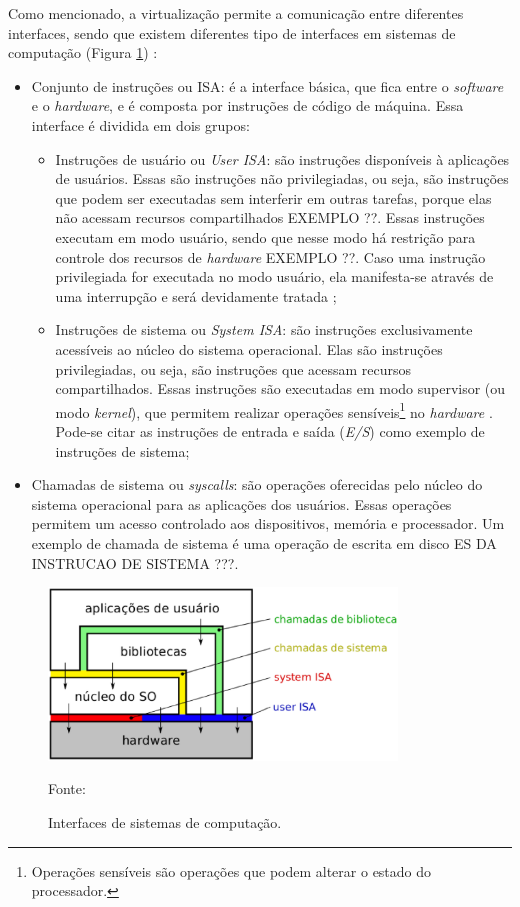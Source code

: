 Como mencionado, a virtualização permite a comunicação entre diferentes interfaces, sendo que existem diferentes tipo de interfaces
em sistemas de computação (Figura \ref{fig:interfaces_isa}) \cite{maziero2013}:
\begin{itemize}
 \item Conjunto de instruções ou \ac{ISA}: é a interface básica, que fica entre o \textit{software} e o \textit{hardware}, e é composta por 
 instruções de código de máquina. Essa interface é dividida em dois grupos:
 \begin{itemize}
  \item Instruções de usuário ou \textit{User \ac{ISA}}: são instruções disponíveis à aplicações de usuários. Essas são instruções 
  não privilegiadas, ou seja, são instruções que podem ser executadas sem interferir em outras tarefas, porque elas não acessam recursos 
  compartilhados EXEMPLO ??. Essas instruções executam em modo usuário, sendo que nesse modo há restrição para controle dos 
  recursos de \textit{hardware} EXEMPLO ??. 
  Caso uma instrução privilegiada for executada no modo usuário, ela manifesta-se através de uma interrupção e será devidamente tratada 
  \cite{buyya2013};
  \item Instruções de sistema ou \textit{System \ac{ISA}}: são instruções exclusivamente acessíveis ao núcleo do sistema operacional. Elas 
  são instruções privilegiadas, ou seja, são instruções que acessam recursos compartilhados. Essas instruções são executadas em modo supervisor 
  (ou modo \textit{kernel}), que permitem realizar operações sensíveis\footnote{Operações sensíveis são operações que podem alterar o estado 
  do processador.} no \textit{hardware} \cite{buyya2013}. Pode-se citar as instruções de entrada e saída (\textit{E/S}) como exemplo de 
  instruções de sistema;
 \end{itemize}
 \item Chamadas de sistema ou \textit{syscalls}: são operações oferecidas pelo núcleo do sistema operacional para as aplicações dos usuários.
 Essas operações permitem um acesso controlado aos dispositivos, memória e processador. Um exemplo de chamada de sistema é uma operação de escrita 
 em disco ES DA INSTRUCAO DE SISTEMA ???.
\end{itemize}

\begin{figure}[h!]
 \centering
 \includegraphics[width=350px]{img/interfaces_isa.eps}
 \caption{Interfaces de sistemas de computação.}
 \label{fig:interfaces_isa}
 Fonte: \citet{maziero2013}
\end{figure}

